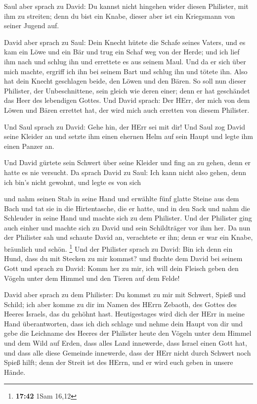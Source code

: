  Saul aber sprach zu David: Du kannst nicht hingehen wider
diesen Philister, mit ihm zu streiten; denn du bist ein Knabe, dieser
aber ist ein Kriegsmann von seiner Jugend auf.

 David aber sprach zu Saul: Dein Knecht hütete die Schafe
seines Vaters, und es kam ein Löwe und ein Bär und trug ein Schaf weg
von der Herde;  und ich lief ihm nach und schlug ihn und
errettete es aus seinem Maul. Und da er sich über mich machte, ergriff
ich ihn bei seinem Bart und schlug ihn und tötete ihn. 
Also hat dein Knecht geschlagen beide, den Löwen und den Bären. So soll
nun dieser Philister, der Unbeschnittene, sein gleich wie deren einer;
denn er hat geschändet das Heer des lebendigen Gottes.  Und
David sprach: Der HErr, der mich von dem Löwen und Bären errettet hat,
der wird mich auch erretten von diesem Philister.

 Und Saul sprach zu David: Gehe hin, der HErr sei mit dir!
Und Saul zog David seine Kleider an und setzte ihm einen ehernen Helm
auf sein Haupt und legte ihm einen Panzer an.

 Und David gürtete sein Schwert über seine Kleider und fing
an zu gehen, denn er hatte es nie versucht. Da sprach David zu Saul: Ich
kann nicht also gehen, denn ich bin's nicht gewohnt, und legte es von
sich

 und nahm seinen Stab in seine Hand und erwählte fünf
glatte Steine aus dem Bach und tat sie in die Hirtentasche, die er
hatte, und in den Sack und nahm die Schleuder in seine Hand und machte
sich zu dem Philister.  Und der Philister ging auch einher
und machte sich zu David und sein Schildträger vor ihm her.
 Da nun der Philister sah und schaute David an, verachtete
er ihn; denn er war ein Knabe, bräunlich und schön. \footnote{\textbf{17:42}
  1Sam 16,12}  Und der Philister sprach zu David: Bin ich
denn ein Hund, dass du mit Stecken zu mir kommst? und fluchte dem David
bei seinem Gott  und sprach zu David: Komm her zu mir, ich
will dein Fleisch geben den Vögeln unter dem Himmel und den Tieren auf
dem Felde!

 David aber sprach zu dem Philister: Du kommst zu mir mit
Schwert, Spieß und Schild; ich aber komme zu dir im Namen des HErrn
Zebaoth, des Gottes des Heeres Israels, das du gehöhnt hast.
 Heutigestages wird dich der HErr in meine Hand
überantworten, dass ich dich schlage und nehme dein Haupt von dir und
gebe die Leichname des Heeres der Philister heute den Vögeln unter dem
Himmel und dem Wild auf Erden, dass alles Land innewerde, dass Israel
einen Gott hat,  und dass alle diese Gemeinde innewerde,
dass der HErr nicht durch Schwert noch Spieß hilft; denn der Streit ist
des HErrn, und er wird euch geben in unsere Hände.

